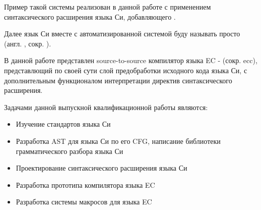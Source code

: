 Пример такой системы реализован в данной работе с применением синтаксического расширения языка Си, добавляющего .

Далее язык Си вместе с автоматизированной системой буду называть просто  (англ. , сокр. ). 




В данной работе представлен source-to-source компилятор языка EC -  (сокр. ecc), представлющий по своей сути слой предобработки исходного кода языка Си, 
с дополнительным функционалом интерпретации директив синтаксического расширения. 




Задачами данной выпускной квалификационной работы являются:

\begin{itemize}
    \item Изучение стандартов\cite{c99_std}\cite{c23_std} языка Си
    \item Разработка AST для языка Си по его CFG, написание библиотеки грамматического разбора языка Си
    \item Проектирование синтаксического расширения языка Си
    \item Разработка прототипа компилятора языка EC
    \item Разработка системы макросов для языка EC
\end{itemize}



